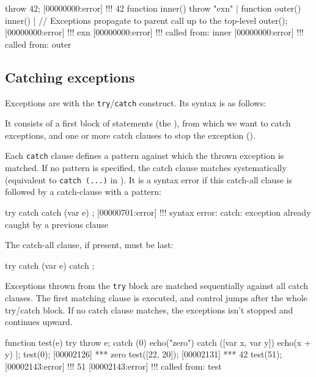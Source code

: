\begin{urbiscript}
throw 42;
[00000000:error] !!! 42
function inner() { throw "exn" } |
function outer() { inner() }|
// Exceptions propagate to parent call up to the top-level
outer();
[00000000:error] !!! exn
[00000000:error] !!!    called from: inner
[00000000:error] !!!    called from: outer
\end{urbiscript}

\subsection{Catching exceptions}
\label{sec:lang:catch}

Exceptions are  with the
\lstinline{try}/\lstinline{catch} construct. Its syntax is as follows:



It consists of a first block of statements (the ), from which
we want to catch exceptions, and one or more catch clauses to stop the
exception ().

Each \lstinline{catch} clause defines a pattern against which the thrown
exception is matched. If no pattern is specified, the catch clause matches
systematically (equivalent to \lstinline|catch (...)| in \Cxx).  It is a
syntax error if this catch-all clause is followed by a catch-clause with a
pattern:

\begin{urbiscript}
try {} catch {} catch (var e) {};
[00000701:error] !!! syntax error: catch: exception already caught by a previous clause
\end{urbiscript}

\noindent
The catch-all clause, if present, must be last:

\begin{urbiscript}
try {} catch (var e) {} catch {};
\end{urbiscript}

Exceptions thrown from the \lstinline{try} block are matched sequentially
against all catch clauses. The first matching clause is executed, and
control jumps after the whole try/catch block. If no catch clause matches,
the exceptions isn't stopped and continues upward.

\begin{urbiscript}
function test(e)
{
  try
  { throw e;  }
  catch (0)
  { echo("zero") }
  catch ([var x, var y])
  { echo(x + y) }
}|;
test(0);
[00002126] *** zero
test([22, 20]);
[00002131] *** 42
test(51);
[00002143:error] !!! 51
[00002143:error] !!!    called from: test
\end{urbiscript}

